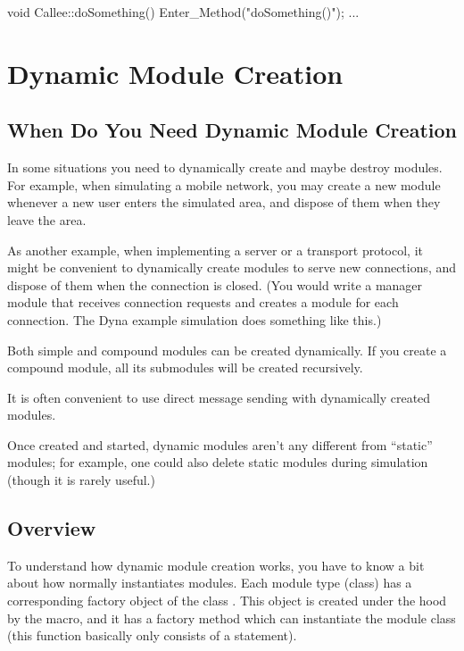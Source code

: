 \begin{cpp}
void Callee::doSomething()
{
    Enter_Method("doSomething()");
    ...
}
\end{cpp}



\section{Dynamic Module Creation}
\label{sec:simple-modules:dynamic-module-creation}

\subsection{When Do You Need Dynamic Module Creation}

In some situations you need to dynamically create and maybe destroy
modules. For example, when simulating a mobile network,
you may create a new module whenever a new user enters
the simulated area, and dispose of them when they leave the area.

As another example, when implementing a server or a transport
protocol, it might be convenient to dynamically create modules
to serve new connections, and dispose of them when the connection
is closed. (You would write a manager module that receives connection
requests and creates a module for each connection.
The Dyna example simulation does something like this.)

Both simple and compound modules can be created dynamically.
If you create a compound module, all its submodules will be created
recursively.

It is often convenient to use direct message sending with dynamically
created modules.

Once created and started, dynamic modules aren't any different from
``static'' modules; for example, one could also delete static modules
during simulation (though it is rarely useful.)


\subsection{Overview}


To understand how dynamic module creation works, you have to know a
bit about how {\opp} normally instantiates modules. Each module type
(class) has a corresponding factory object of the class
. This object is created under the hood by the
 macro, and it has a factory
method which can instantiate the module class (this function basically
only consists of a  statement).

